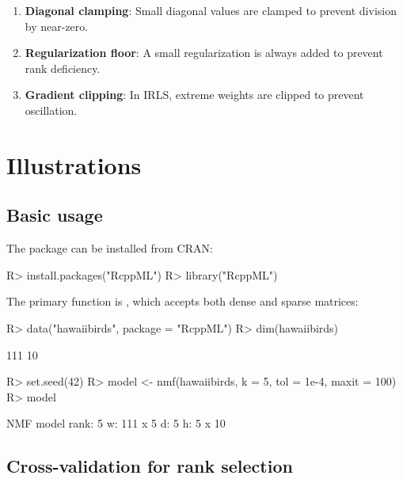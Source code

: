 \documentclass[article]{jss_modified}
\newcommand{\fct}[1]{\code{#1()}}
\begin{document}
\begin{enumerate}
  \item \textbf{Diagonal clamping}: Small diagonal values are clamped to prevent 
  division by near-zero.
  \item \textbf{Regularization floor}: A small regularization is always added to 
  prevent rank deficiency.
  \item \textbf{Gradient clipping}: In IRLS, extreme weights are clipped to 
  prevent oscillation.
\end{enumerate}


\section{Illustrations} \label{sec:illustrations}

\subsection{Basic usage}

The  package can be installed from CRAN:
%
\begin{CodeChunk}
\begin{CodeInput}
R> install.packages("RcppML")
R> library("RcppML")
\end{CodeInput}
\end{CodeChunk}

The primary function is \fct{nmf}, which accepts both dense and sparse matrices:
%
\begin{CodeChunk}
\begin{CodeInput}
R> data("hawaiibirds", package = "RcppML")
R> dim(hawaiibirds)
\end{CodeInput}
\begin{CodeOutput}
[1] 111  10
\end{CodeOutput}
\begin{CodeInput}
R> set.seed(42)
R> model <- nmf(hawaiibirds, k = 5, tol = 1e-4, maxit = 100)
R> model
\end{CodeInput}
\begin{CodeOutput}
NMF model
 rank: 5 
 w: 111 x 5 
 d: 5 
 h: 5 x 10 
\end{CodeOutput}
\end{CodeChunk}

\subsection{Cross-validation for rank selection}
\end{document}
